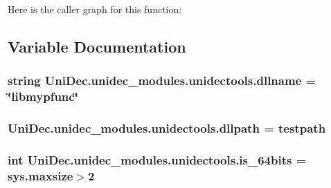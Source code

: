 Here is the caller graph for this function\+:




\subsection{Variable Documentation}
\hypertarget{namespace_uni_dec_1_1unidec__modules_1_1unidectools_ae66866441c136f780ba16b7f8daff0e0}{}
\subsubsection[{dllname}]{\setlength{\rightskip}{0pt plus 5cm}string Uni\+Dec.\+unidec\+\_\+modules.\+unidectools.\+dllname = \char`\"{}libmypfunc\char`\"{}}\label{namespace_uni_dec_1_1unidec__modules_1_1unidectools_ae66866441c136f780ba16b7f8daff0e0}
\hypertarget{namespace_uni_dec_1_1unidec__modules_1_1unidectools_a1c5e20c347cb5bcedac39f29d819a47e}{}
\subsubsection[{dllpath}]{\setlength{\rightskip}{0pt plus 5cm}Uni\+Dec.\+unidec\+\_\+modules.\+unidectools.\+dllpath = {\bf testpath}}\label{namespace_uni_dec_1_1unidec__modules_1_1unidectools_a1c5e20c347cb5bcedac39f29d819a47e}
\hypertarget{namespace_uni_dec_1_1unidec__modules_1_1unidectools_ad957a446a7c0f48f5e7286f14bfff315}{}
\subsubsection[{is\+\_\+64bits}]{\setlength{\rightskip}{0pt plus 5cm}int Uni\+Dec.\+unidec\+\_\+modules.\+unidectools.\+is\+\_\+64bits = sys.\+maxsize$>$2}\label{namespace_uni_dec_1_1unidec__modules_1_1unidectools_ad957a446a7c0f48f5e7286f14bfff315}
\hypertarget{namespace_uni_dec_1_1unidec__modules_1_1unidectools_ad22807c824de9a59ef9fe437ea81bbe5}{}
